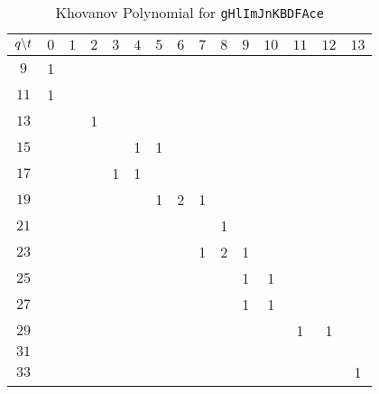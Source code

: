 \documentclass{article}
\theoremstyle{plain}
\begin{document}
        \begin{table}[H]
            \centering
            \begin{tabular}{| c | c | c | c | c | c | c | c | c | c | c | c | c | c | c |}
                \hline
                $q\symbol{92}t$&$0$&$1$&$2$&$3$&$4$&$5$&$6$&$7$&$8$&$9$&$10$&$11$&$12$&$13$\\
                \hline
                $9$&1&&&&&&&&&&&&&\\
                \hline
                $11$&1&&&&&&&&&&&&&\\
                \hline
                $13$&&&1&&&&&&&&&&&\\
                \hline
                $15$&&&&&1&1&&&&&&&&\\
                \hline
                $17$&&&&1&1&&&&&&&&&\\
                \hline
                $19$&&&&&&1&2&1&&&&&&\\
                \hline
                $21$&&&&&&&&&1&&&&&\\
                \hline
                $23$&&&&&&&&1&2&1&&&&\\
                \hline
                $25$&&&&&&&&&&1&1&&&\\
                \hline
                $27$&&&&&&&&&&1&1&&&\\
                \hline
                $29$&&&&&&&&&&&&1&1&\\
                \hline
                $31$&&&&&&&&&&&&&&\\
                \hline
                $33$&&&&&&&&&&&&&&1\\
                \hline
            \end{tabular}
            \caption{Khovanov Polynomial for \texttt{gHlImJnKBDFAce}}
            \label{table:t_gHlImJnKBDFAce_kho}
        \end{table}
\end{document}
